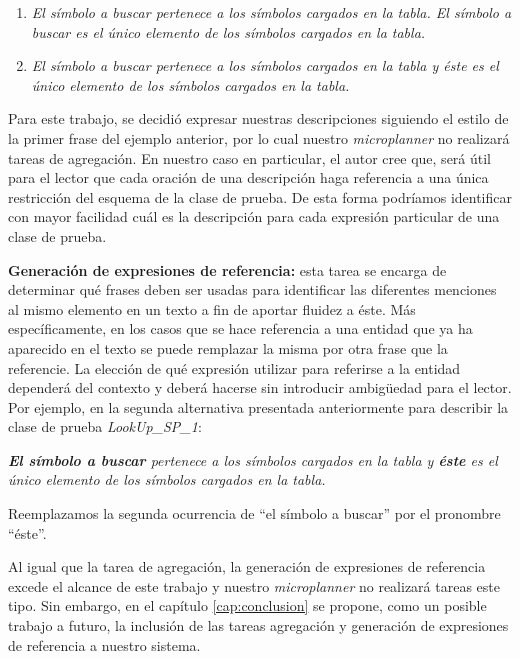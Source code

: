 \begin{center}
\begin{enumerate}
  \item \emph{El símbolo a buscar pertenece a los símbolos cargados en la tabla. El símbolo a buscar es el único elemento de los símbolos cargados en la tabla.} 
  \item \emph{El símbolo a buscar pertenece a los símbolos cargados en la tabla y éste es el único elemento de los símbolos cargados en la tabla.}
\end{enumerate}
\end{center}

\medskip
\noindent
Para este trabajo, se decidió expresar nuestras descripciones siguiendo el estilo de la primer frase del ejemplo anterior, por lo cual nuestro \textit{microplanner} no realizará tareas de agregación. En nuestro caso en particular, el autor cree que, será útil para el lector que cada oración de una descripción haga referencia a una única restricción del esquema de la clase de prueba. De esta forma podríamos identificar con mayor facilidad cuál es la descripción para cada expresión particular de una clase de prueba.


\medskip
\noindent
\textbf{Generación de expresiones de referencia:} esta tarea se encarga de determinar qué frases deben ser usadas para identificar las diferentes menciones al mismo elemento en un texto a fin de aportar fluidez a éste. Más específicamente, en los casos que se hace referencia a una entidad que ya ha aparecido en el texto se puede remplazar la misma por otra frase que la referencie. La elección de qué expresión utilizar para referirse a la entidad dependerá del contexto y deberá hacerse sin introducir ambigüedad para el lector. Por ejemplo, en la segunda alternativa presentada anteriormente para describir la clase de prueba \emph{LookUp\_SP\_1}:

\begin{center}
 \emph{\textbf{El símbolo a buscar} pertenece a los símbolos cargados en la tabla y \textbf{éste} es el único elemento de los símbolos cargados en la tabla.}
\end{center}

\noindent
Reemplazamos la segunda ocurrencia de ``el símbolo a buscar'' por el pronombre ``éste''.

\smallskip
Al igual que la tarea de agregación, la generación de expresiones de referencia excede el alcance de este trabajo y nuestro \textit{microplanner} no realizará tareas este tipo. Sin embargo, en el capítulo \ref{cap:conclusion} se propone, como un posible trabajo a futuro, la inclusión de las tareas agregación y generación de expresiones de referencia a nuestro sistema. 

